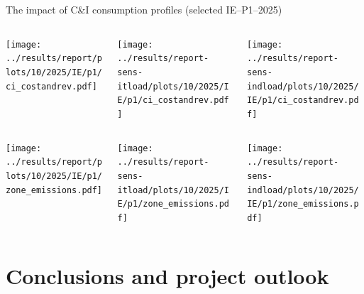\begin{frame}{The impact of C\&I consumption profiles (selected IE--P1--2025)}


  {\footnotesize

  \begin{columns}
    \begin{column}{5cm}
    \centering
    \texttt{[image: ../results/report/plots/10/2025/IE/p1/ci\_costandrev.pdf]}
    \end{column}
  
    \begin{column}{5cm}
    \centering
    \texttt{[image: ../results/report-sens-itload/plots/10/2025/IE/p1/ci\_costandrev.pdf]}
    \end{column}
  
    \begin{column}{5cm}
    \centering
    \texttt{[image: ../results/report-sens-indload/plots/10/2025/IE/p1/ci\_costandrev.pdf]}
    \end{column}

  \end{columns}

  \begin{columns}
    \begin{column}{5cm}
    \centering
    \texttt{[image: ../results/report/plots/10/2025/IE/p1/zone\_emissions.pdf]}
    \end{column}
  
    \begin{column}{5cm}
    \centering
    \texttt{[image: ../results/report-sens-itload/plots/10/2025/IE/p1/zone\_emissions.pdf]}
    \end{column}
  
    \begin{column}{5cm}
    \centering
    \texttt{[image: ../results/report-sens-indload/plots/10/2025/IE/p1/zone\_emissions.pdf]}
    \end{column}

  \end{columns}
  }


\end{frame}


\section{Conclusions and project outlook}

